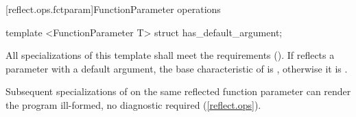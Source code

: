 [reflect.ops.fctparam]{FunctionParameter operations }
\begin{std.txt}\color{addclr}
\begin{itemdecl}
template <FunctionParameter T> struct has_default_argument;
\end{itemdecl}
\begin{itemdescr}
\pnum
All specializations of this template shall meet the 
requirements (). If  reflects a parameter with a default
argument, the base characteristic of  is
, otherwise it is .

\pnum
\remarks
Subsequent specializations of  on the same
reflected function parameter can render the program ill-formed, no diagnostic
required (\ref{reflect.ops}).
\end{itemdescr}
\end{std.txt}


